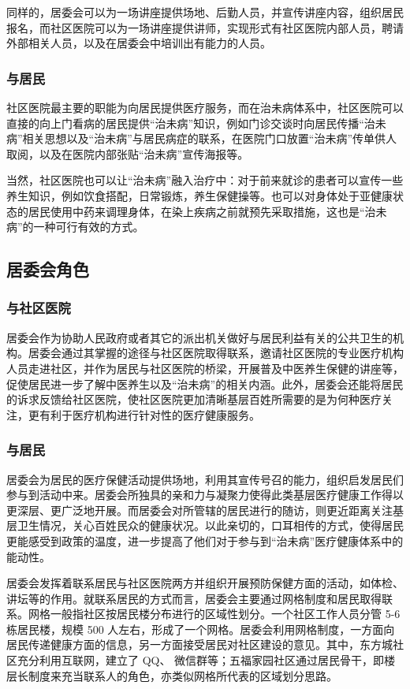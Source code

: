 同样的，居委会可以为一场讲座提供场地、后勤人员，并宣传讲座内容，组织居民报名，而社区医院可以为一场讲座提供讲师，实现形式有社区医院内部人员，聘请外部相关人员，以及在居委会中培训出有能力的人员。
\subsubsection{与居民}
社区医院最主要的职能为向居民提供医疗服务，而在治未病体系中，社区医院可以直接的向上门看病的居民提供“治未病”知识，例如门诊交谈时向居民传播“治未病”相关思想以及“治未病”与居民病症的联系，在医院门口放置“治未病”传单供人取阅，以及在医院内部张贴“治未病”宣传海报等。

当然，社区医院也可以让“治未病”融入治疗中：对于前来就诊的患者可以宣传一些养生知识，例如饮食搭配，日常锻炼，养生保健操等。也可以对身体处于亚健康状态的居民使用中药来调理身体，在染上疾病之前就预先采取措施，这也是“治未病”的一种可行有效的方式。
\subsection{居委会角色}
\subsubsection{与社区医院}
居委会作为协助人民政府或者其它的派出机关做好与居民利益有关的公共卫生的机构。居委会通过其掌握的途径与社区医院取得联系，邀请社区医院的专业医疗机构人员走进社区，并作为居民与社区医院的桥梁，开展普及中医养生保健的讲座等，促使居民进一步了解中医养生以及“治未病”的相关内涵。此外，居委会还能将居民的诉求反馈给社区医院，使社区医院更加清晰基层百姓所需要的是为何种医疗关注，更有利于医疗机构进行针对性的医疗健康服务。

\subsubsection{与居民}
居委会为居民的医疗保健活动提供场地，利用其宣传号召的能力，组织启发居民们参与到活动中来。居委会所独具的亲和力与凝聚力使得此类基层医疗健康工作得以更深层、更广泛地开展。而居委会对所管辖的居民进行的随访，则更近距离关注基层卫生情况，关心百姓民众的健康状况。以此亲切的，口耳相传的方式，使得居民更能感受到政策的温度，进一步提高了他们对于参与到“治未病”医疗健康体系中的能动性。

居委会发挥着联系居民与社区医院两方并组织开展预防保健方面的活动，如体检、讲坛等的作用。就联系居民的方式而言，居委会主要通过网格制度和居民取得联系。网格一般指社区按居民楼分布进行的区域性划分。一个社区工作人员分管 5-6 栋居民楼，规模 500 人左右，形成了一个网格。居委会利用网格制度，一方面向居民传递健康方面的信息，另一方面接受居民对社区建设的意见。其中，东方城社区充分利用互联网，建立了 QQ、 微信群等；五福家园社区通过居民骨干，即楼层长制度来充当联系人的角色，亦类似网格所代表的区域划分思路。

